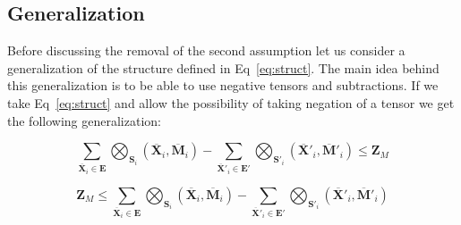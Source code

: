 \documentclass{article}
\newcommand{\TX}{\textbf{X}\xspace}
\newcommand{\TZ}{\textbf{Z}\xspace}
\newcommand{\TM}{\textbf{M}\xspace}
\newcommand{\TE}{\textbf{E}\xspace}
\begin{document}
\subsection{Generalization}
Before discussing the removal of the second assumption let us consider a generalization of the structure defined in Eq~\ref{eq:struct}. The main idea behind this generalization is to be able to use negative tensors and subtractions. If we take Eq~\ref{eq:struct} and allow the possibility of taking negation of a tensor we get the following generalization:
%
%
%

\begin{equation}
\label{eq:general1}
	\displaystyle\sum\limits_{\overline{\TX}_i \in \TE}\bigotimes_{\textbf{S}_i}(\overline{\TX}_i,\overline{\TM}_i) - 
	\sum\limits_{\overline{\TX}'_i \in \TE'}\bigotimes_{\textbf{S}'_i}(\overline{\TX}'_i,\overline{\TM}'_i) \le \TZ_{M}
\end{equation}

\begin{equation}
\label{eq:general2}
	\displaystyle\TZ_{M} \le \sum\limits_{\overline{\TX}_i \in \TE}\bigotimes_{\textbf{S}_i}(\overline{\TX}_i,\overline{\TM}_i) - 
	\sum\limits_{\overline{\TX}'_i \in \TE'}\bigotimes_{\textbf{S}'_i}(\overline{\TX}'_i,\overline{\TM}'_i) 
\end{equation}
\end{document}
